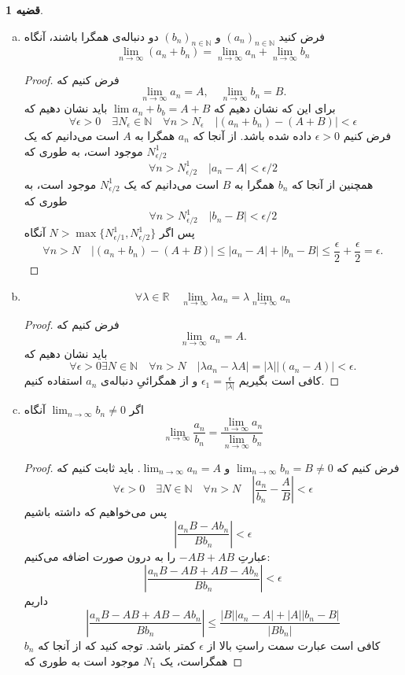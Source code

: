 \documentclass[12pt,a4paper]{article}
\theoremstyle{definition}
\newtheorem{thm}{قضیه}
\begin{document}
\begin{thm}\hfill 
\begin{enumerate}[a.]
\item
فرض کنید 
$(a_n)_ {n \in \mathbb{N}}$
و 
$(b_n)_{n \in \mathbb{N}} $
دو دنباله‌ی همگرا باشند، آنگاه
\[
\lim_{n \to \infty}(a_n+b_n)=\lim_{n \to \infty}a_n+\lim_{n \to \infty}b_n
\]
\begin{proof}
فرض کنیم
که
\[
\lim_{n\to \infty} a_n=A, \quad \lim_{n\to \infty}b_n=B.
\]
برای این که نشان دهیم که
$\lim a_n+b_b=A+B$
باید نشان دهیم که
\[
\forall \epsilon >0 \quad \exists N_\epsilon \in \mathbb{N} \quad \forall n>N_\epsilon \quad |(a_n+b_n)-(A+B)| < \epsilon
\]
فرض کنیم
$\epsilon>0$
داده شده باشد. 
از آنجا که
$a_n$
همگرا به 
$A$
است
می‌دانیم که یک
$N^1_{\epsilon/2}$
موجود است، به طوری که
\[
\forall n>N^1_{\epsilon/2} \quad |a_n-A|<\epsilon/2
\]
همچنین
از آنجا که
$b_n$
همگرا به 
$B$
است
می‌دانیم که یک
$N^1_{\epsilon/2}$
موجود است، به طوری که
\[
\forall n>N^1_{\epsilon/2} \quad |b_n-B|<\epsilon/2
\]
پس اگر
$N>\max\{N^1_{\epsilon/1},N^1_{\epsilon/2}\}$
آنگاه 
\[
\forall n>N \quad |(a_n+b_n)-(A+B)|\leq |a_n-A|+|b_n-B|\leq \frac{\epsilon}{2}+\frac{\epsilon}{2}=\epsilon.
\]
\end{proof}
\item
\[
\forall \lambda \in \mathbb{R} \quad \lim_{n \to \infty}\lambda a_n = \lambda \lim_{n \to \infty}a_n
\]
\begin{proof}
فرض کنیم که
\[
\lim_{n\to \infty} a_n=A.
\]
باید نشان دهیم
که
\[
\forall\epsilon>0 \exists N\in \mathbb{N}\quad \forall n>N
\quad |\lambda a_n-\lambda A|=|\lambda| |(a_n-A)|<\epsilon.
\]
کافی است بگیریم
$\epsilon_1=\frac{\epsilon}{|\lambda|}$
و از همگرائیِ دنباله‌ی
$a_n$
استفاده کنیم.
\end{proof}
\item
اگر 
$\lim_{n \to \infty}b_n \neq 0$
آنگاه
\[
\lim_{n \to \infty}\frac{a_n}{b_n}=\frac{\lim_{n \to \infty}a_n}{\lim_{n \to \infty}b_n}
\]
\begin{proof}
فرض کنیم که
$\lim_{n\to \infty}b_n=B\not=0$
و
$\lim_{n\to \infty}a_n=A$.
باید ثابت کنیم که
\[
\forall \epsilon>0 \quad \exists N\in \mathbb{N}\quad \forall n>N \quad 
|\frac{a_n}{b_n}-\frac{A}{B}|<\epsilon
\]
پس می‌خواهیم که داشته باشیم
\[
|\frac{a_nB-Ab_n}{Bb_n}|<\epsilon
\]
عبارتِ
$-AB+AB$
را به درون صورت اضافه می‌کنیم:
\[
|\frac{a_nB-AB+AB-Ab_n}{Bb_n}|
<\epsilon
\]
داریم
\[
|\frac{a_nB-AB+AB-Ab_n}{Bb_n}|\leq \frac{|B||a_n-A|+|A||b_n-B|}{|{Bb_n}|}
\]
کافی است عبارت سمت راستِ بالا از
$\epsilon$
کمتر باشد.
توجه کنید که از آنجا که
$b_n$
همگراست، یک
$N_1$
موجود است به طوری که 

\end{proof}
\end{enumerate}
\end{thm}
\end{document}
